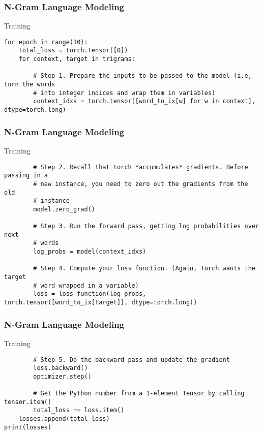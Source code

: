 \begin{frame}[fragile]
\frametitle{N-Gram Language Modeling}
Training 
 \begin{lstlisting}
for epoch in range(10):
    total_loss = torch.Tensor([0])
    for context, target in trigrams:

        # Step 1. Prepare the inputs to be passed to the model (i.e, turn the words
        # into integer indices and wrap them in variables)
        context_idxs = torch.tensor([word_to_ix[w] for w in context], dtype=torch.long)

\end{lstlisting}     

\end{frame} 

\begin{frame}[fragile]
\frametitle{N-Gram Language Modeling}
Training 
 \begin{lstlisting}
        # Step 2. Recall that torch *accumulates* gradients. Before passing in a
        # new instance, you need to zero out the gradients from the old
        # instance
        model.zero_grad()

        # Step 3. Run the forward pass, getting log probabilities over next
        # words
        log_probs = model(context_idxs)

        # Step 4. Compute your loss function. (Again, Torch wants the target
        # word wrapped in a variable)
        loss = loss_function(log_probs, torch.tensor([word_to_ix[target]], dtype=torch.long))
\end{lstlisting}     

\end{frame} 

\begin{frame}[fragile]
\frametitle{N-Gram Language Modeling}
Training 
 \begin{lstlisting}
        # Step 5. Do the backward pass and update the gradient
        loss.backward()
        optimizer.step()

        # Get the Python number from a 1-element Tensor by calling tensor.item()
        total_loss += loss.item()
    losses.append(total_loss)
print(losses) 
\end{lstlisting}     
\end{frame} 

